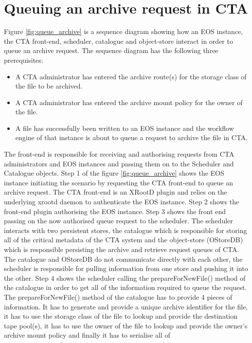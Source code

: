 \documentclass[10pt,a4paper]{article}
\begin{document}
\section{Queuing an archive request in CTA}

Figure \ref{fig:queue_archive} is a sequence diagram showing how an EOS instance, the CTA front-end, scheduler,
catalogue and object-store interact in order to queue an archive request.  The sequence diagram has the following
three prerequisites: \begin{itemize}
  \item A CTA administrator has entered the archive route(s) for the storage class of the file to be archived.
  \item A CTA administrator has entered the archive mount policy for the owner of the file.  \item A file has
  successfully been written to an EOS instance and the workflow engine of that instance is about to queue a request
  to archive the file in CTA.
\end{itemize} The front-end is responsible for receiving and authorising requests from CTA administrators and EOS
instances and passing them on to the Scheduler and Catalogue objects.  Step 1 of the figure \ref{fig:queue_archive}
shows the EOS instance initiating the scenario by requesting the CTA front-end to queue an archive request.
The CTA front-end is an XRootD plugin and relies on the underlying xrootd daemon to authenticate the EOS instance.
Step 2 shows the front-end plugin authorising the EOS instance. Step 3 shows the front end passing on the now
authorised queue request to the scheduler.  The scheduler interacts with two persistent stores, the catalogue
which is responsible for storing all of the critical metadata of the CTA system and the object-store (OStoreDB)
which is responsible persisting the archive and retrieve request queues of CTA.  The catalogue and OStoreDB do
not communicate directly with each other, the scheduler is responsible for pulling information from one store and
pushing it into the other.  Step 4 shows the scheduler calling the prepareForNewFile() method of the catalogue in
order to get all of the information required to queue the request.  The prepareForNewFile() method of the catalogue
has to provide 4 pieces of information.  It has to generate and provide a unique archive identifier for the file,
it has to use the storage class of the file to lookup and provide the destination tape pool(s), it has to use the
owner of the file to lookup and provide the owner's archive mount policy and finally it has to serialise all of
\end{document}
